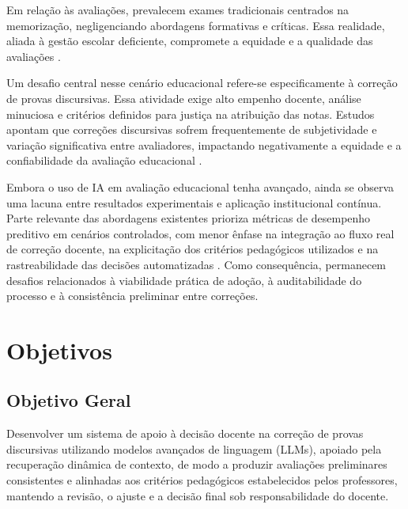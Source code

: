 Em relação às avaliações, prevalecem exames tradicionais centrados na memorização, negligenciando abordagens formativas e críticas. Essa realidade, aliada à gestão escolar deficiente, compromete a equidade e a qualidade das avaliações \cite{santos_articulacao_2016}.

Um desafio central nesse cenário educacional refere-se especificamente à correção de provas discursivas. Essa atividade exige alto empenho docente, análise minuciosa e critérios definidos para justiça na atribuição das notas. Estudos apontam que correções discursivas sofrem frequentemente de subjetividade e variação significativa entre avaliadores, impactando negativamente a equidade e a confiabilidade da avaliação educacional \cite{borges_avaliacao_2017}.

Embora o uso de IA em avaliação educacional tenha avançado, ainda se observa uma lacuna entre resultados experimentais e aplicação institucional contínua. Parte relevante das abordagens existentes prioriza métricas de desempenho preditivo em cenários controlados, com menor ênfase na integração ao fluxo real de correção docente, na explicitação dos critérios pedagógicos utilizados e na rastreabilidade das decisões automatizadas \cite{borges_avaliacao_2017, shahzad_comprehensive_2025}. Como consequência, permanecem desafios relacionados à viabilidade prática de adoção, à auditabilidade do processo e à consistência preliminar entre correções.

\section{Objetivos}

\subsection{Objetivo Geral} 
Desenvolver um sistema de apoio à decisão docente na correção de provas discursivas utilizando modelos avançados de linguagem (LLMs), apoiado pela recuperação dinâmica de contexto, de modo a produzir avaliações preliminares consistentes e alinhadas aos critérios pedagógicos estabelecidos pelos professores, mantendo a revisão, o ajuste e a decisão final sob responsabilidade do docente.

